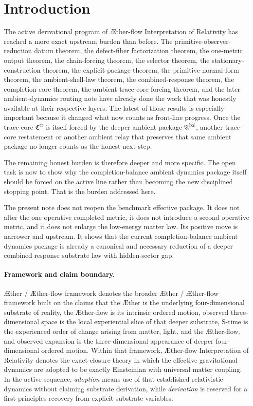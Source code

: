 \documentclass[11pt]{article}
\newcommand{\Aether}{\AE{}ther}
\newcommand{\Aflow}{\AE{}ther-flow}
\newcommand{\TheoryName}{\Aflow{} Interpretation of Relativity}
\newcommand{\TheoryProgram}{\Aether{} / \Aflow{} framework}
\newcommand{\AmbientPackage}{\mathfrak A^{\mathrm{bal}}}
\newcommand{\TraceCore}{\mathfrak C^{\mathrm{tr}}}
\begin{document}
\section{Introduction}

The active derivational program of \TheoryName{} has reached a more exact upstream burden than before. The primitive-observer-reduction datum theorem, the defect-fiber factorization theorem, the one-metric output theorem, the chain-forcing theorem, the selector theorem, the stationary-construction theorem, the explicit-package theorem, the primitive-normal-form theorem, the ambient-shell-law theorem, the combined-response theorem, the completion-core theorem, the ambient trace-core forcing theorem, and the later ambient-dynamics routing note have already done the work that was honestly available at their respective layers. The latest of those results is especially important because it changed what now counts as front-line progress. Once the trace core \(\TraceCore\) is itself forced by the deeper ambient package \(\AmbientPackage\), another trace-core restatement or another ambient relay that preserves that same ambient package no longer counts as the honest next step.

The remaining honest burden is therefore deeper and more specific. The open task is now to show why the completion-balance ambient dynamics package itself should be forced on the active line rather than becoming the new disciplined stopping point. That is the burden addressed here.

The present note does not reopen the benchmark effective package. It does not alter the one operative completed metric, it does not introduce a second operative metric, and it does not enlarge the low-energy matter law. Its positive move is narrower and upstream. It shows that the current completion-balance ambient dynamics package is already a canonical and necessary reduction of a deeper combined response substrate law with hidden-sector gap.

\paragraph{Framework and claim boundary.}
\TheoryProgram{} denotes the broader \Aether{} / \Aflow{} framework built on the claims that the \Aether{} is the underlying four-dimensional substrate of reality, the \Aflow{} is its intrinsic ordered motion, observed three-dimensional space is the local experiential slice of that deeper substrate, S-time is the experienced order of change arising from matter, light, and the \Aflow{}, and observed expansion is the three-dimensional appearance of deeper four-dimensional ordered motion. Within that framework, \TheoryName{} denotes the exact-closure theory in which the effective gravitational dynamics are adopted to be exactly Einsteinian with universal matter coupling. In the active sequence, \emph{adoption} means use of that established relativistic dynamics without claiming substrate derivation, while \emph{derivation} is reserved for a first-principles recovery from explicit substrate variables.
\end{document}
